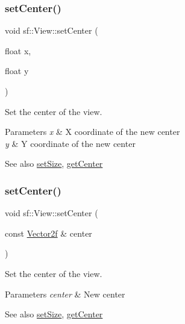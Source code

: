 \subsubsection{\texorpdfstring{setCenter()}{setCenter()}\hspace{0.1cm}{\footnotesize\ttfamily [1/2]}}
{\footnotesize\ttfamily void sf\+::\+View\+::set\+Center (\begin{DoxyParamCaption}\item[{float}]{x,  }\item[{float}]{y }\end{DoxyParamCaption})}



Set the center of the view. 


\begin{DoxyParams}{Parameters}
{\em x} & X coordinate of the new center \\
\hline
{\em y} & Y coordinate of the new center\\
\hline
\end{DoxyParams}
\begin{DoxySeeAlso}{See also}
\mbox{\hyperlink{classsf_1_1_view_a9525b73fe9fbaceb9568faf56b399dab}{set\+Size}}, \mbox{\hyperlink{classsf_1_1_view_a7f4443c194c691ae4dcf8fd9dd0eaa46}{get\+Center}} \begin{DoxyVerb}\end{DoxyVerb}
 
\end{DoxySeeAlso}
\mbox{\label{classsf_1_1_view_ab0296b03793e0873e6ae9e15311f3e78}} 
\subsubsection{\texorpdfstring{setCenter()}{setCenter()}\hspace{0.1cm}{\footnotesize\ttfamily [2/2]}}
{\footnotesize\ttfamily void sf\+::\+View\+::set\+Center (\begin{DoxyParamCaption}\item[{const \mbox{\hyperlink{classsf_1_1_vector2}{Vector2f}} \&}]{center }\end{DoxyParamCaption})}



Set the center of the view. 


\begin{DoxyParams}{Parameters}
{\em center} & New center\\
\hline
\end{DoxyParams}
\begin{DoxySeeAlso}{See also}
\mbox{\hyperlink{classsf_1_1_view_a9525b73fe9fbaceb9568faf56b399dab}{set\+Size}}, \mbox{\hyperlink{classsf_1_1_view_a7f4443c194c691ae4dcf8fd9dd0eaa46}{get\+Center}} \begin{DoxyVerb}\end{DoxyVerb}
 
\end{DoxySeeAlso}
\mbox{\label{classsf_1_1_view_a24d0503c9c51f5ef5918612786d325c1}} 

